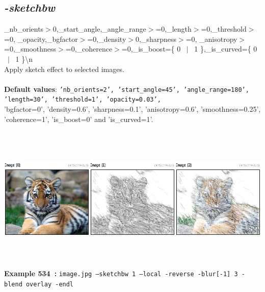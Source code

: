 \documentclass[a4paper,11pt,twoside]{book}
\begin{document}
\subsection{\emph{-sketchbw} }\vspace*{-0.5em}
\_nb\_orients$>$0,\_start\_angle,\_angle\_range$>$=0,\_length$>$=0,\_threshold$>$=0,
\_opacity,\_bgfactor$>$=0,\_density$>$0,\_sharpness$>$=0,
\_anisotropy$>$=0,\_smoothness$>$=0,\_coherence$>$=0,\_is\_boost=\{ 0 ~$|$~ 1 \},\_is\_curved=\{ 0 ~$|$~ 1 \}\textbackslash n
~\\Apply sketch effect to selected images.
~\\~\\\textbf{Default values}: {\small \texttt{'nb\_orients=2', 'start\_angle=45', 'angle\_range=180', 'length=30', 'threshold=1', 'opacity=0.03',}}
~\\'bgfactor=0', 'density=0.6', 'sharpness=0.1', 'anisotropy=0.6', 'smoothness=0.25', 'coherence=1', 'is\_boost=0' and 'is\_curved=1'.
\begin{center}\includegraphics[keepaspectratio=true,height=7cm,width=\textwidth]{img/gmic_def534.jpg}\\
{\footnotesize \textbf{Example 534~:} \texttt{image.jpg --sketchbw 1 --local -reverse -blur[-1] 3 -blend overlay -endl}}
\end{center}
\end{document}
